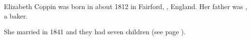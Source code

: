 
Elizabeth Coppin was born in about 1812 in Fairford, , England.\cite{Census1861Merrett}
Her father was , a baker.\cite{MerrettCoppinMarriageCert}

She married  in 1841\cite{PeterKarpinski_2016-04-04,MerrettCoppinMarriageCert} and they had seven children (see page \pageref{James_Merrett}).
